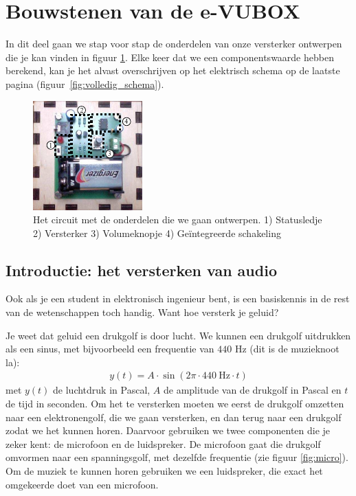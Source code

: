 \documentclass{article}
\begin{document}
	\section{Bouwstenen van de e-VUBOX}
	\label{sec:bouwstenen}
		In dit deel gaan we stap voor stap de onderdelen van onze versterker ontwerpen die je kan vinden in  figuur \ref{fig:pcb}. Elke keer dat we een componentswaarde hebben berekend, kan je het alvast overschrijven op het elektrisch schema op de laatste pagina (figuur~\ref{fig:volledig_schema}). 

		\begin{figure}[htbp]
				\centering
				\includegraphics[scale=3]{pcb}
				\caption{Het circuit met de onderdelen die we gaan ontwerpen. 1) Statusledje 2) Versterker 3) Volumeknopje 4) Ge\"integreerde schakeling}
				\label{fig:pcb}
			\end{figure}

		\subsection{Introductie: het versterken van audio}

			Ook als je een student in elektronisch ingenieur bent, is een basiskennis in de rest van de wetenschappen toch handig. Want hoe versterk je geluid?

			Je weet dat geluid een drukgolf is door lucht. We kunnen een drukgolf uitdrukken als een sinus, met bijvoorbeeld een frequentie van $440$ Hz (dit is de muzieknoot la):
			\begin{align}
				y(t) = A \cdot \sin (2\pi \cdot 440~\text{Hz} \cdot t)
			\end{align}
			met $y(t)$ de luchtdruk in Pascal, $A$ de amplitude van de drukgolf in Pascal en $t$ de tijd in seconden.
			Om het te versterken moeten we eerst de drukgolf omzetten naar een elektronengolf, die we gaan versterken, en dan terug naar een drukgolf zodat we het kunnen horen. Daarvoor gebruiken we twee componenten die je zeker kent: de microfoon en de luidspreker.
			De microfoon gaat die drukgolf omvormen naar een spanningsgolf, met dezelfde frequentie (zie figuur \ref{fig:micro}). Om de muziek te kunnen horen gebruiken we een luidspreker, die exact het omgekeerde doet van een microfoon. 
\end{document}
